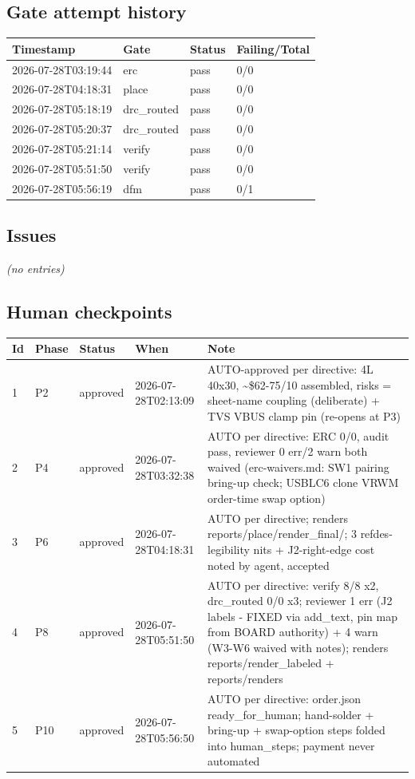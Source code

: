 \documentclass[11pt,a4paper]{article}
\begin{document}
\subsection*{Gate attempt history}
{\small
\begin{longtable}{llll}
\toprule
\textbf{Timestamp} & \textbf{Gate} & \textbf{Status} & \textbf{Failing/Total} \\
\midrule
\endhead
2026-07-28T03:19:44 & erc & pass & 0/0 \\
2026-07-28T04:18:31 & place & pass & 0/0 \\
2026-07-28T05:18:19 & drc\_routed & pass & 0/0 \\
2026-07-28T05:20:37 & drc\_routed & pass & 0/0 \\
2026-07-28T05:21:14 & verify & pass & 0/0 \\
2026-07-28T05:51:50 & verify & pass & 0/0 \\
2026-07-28T05:56:19 & dfm & pass & 0/1 \\
\bottomrule
\end{longtable}
}
\subsection*{Issues}
\emph{(no entries)}
\subsection*{Human checkpoints}
{\small
\begin{longtable}{lllp{2.6cm}p{6.4cm}}
\toprule
\textbf{Id} & \textbf{Phase} & \textbf{Status} & \textbf{When} & \textbf{Note} \\
\midrule
\endhead
1 & P2 & approved & 2026-07-28T02:13:09 & AUTO-approved per directive: 4L 40x30, \textasciitilde{}\$62-75/10 assembled, risks = sheet-name coupling (deliberate) + TVS VBUS clamp pin (re-opens at P3) \\
2 & P4 & approved & 2026-07-28T03:32:38 & AUTO per directive: ERC 0/0, audit pass, reviewer 0 err/2 warn both waived (erc-waivers.md: SW1 pairing bring-up check; USBLC6 clone VRWM order-time swap option) \\
3 & P6 & approved & 2026-07-28T04:18:31 & AUTO per directive; renders reports/place/render\_final/; 3 refdes-legibility nits + J2-right-edge cost noted by agent, accepted \\
4 & P8 & approved & 2026-07-28T05:51:50 & AUTO per directive: verify 8/8 x2, drc\_routed 0/0 x3; reviewer 1 err (J2 labels - FIXED via add\_text, pin map from BOARD authority) + 4 warn (W3-W6 waived with notes); renders reports/render\_labeled + reports/renders \\
5 & P10 & approved & 2026-07-28T05:56:50 & AUTO per directive: order.json ready\_for\_human; hand-solder + bring-up + swap-option steps folded into human\_steps; payment never automated \\
\bottomrule
\end{longtable}
}
\end{document}
